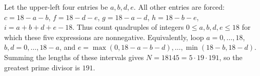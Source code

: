 Let the upper-left four entries be $a,b,d,e$. All other entries are forced: $c=18-a-b$, $f=18-d-e$, $g=18-a-d$, $h=18-b-e$, $i=a+b+d+e-18$. Thus count quadruples of integers $0\le a,b,d,e\le18$ for which these five expressions are nonnegative. Equivalently, loop $a=0,\ldots,18$, $b,d=0,\ldots,18-a$, and $e=\max(0,18-a-b-d),\ldots,\min(18-b,18-d)$. Summing the lengths of these intervals gives $N=18145=5\cdot19\cdot191$, so the greatest prime divisor is $\boxed{191}$.
